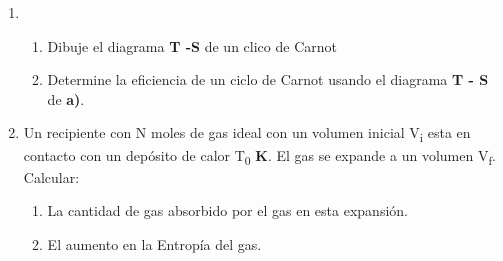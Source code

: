 \documentclass[a4paper,11pt]{extarticle} %
\newcommand{\ut}[1]{\textbf{#1}} %
\begin{document}
\begin{enumerate}[label=\textbf{\arabic*}), leftmargin=*]

    \item{
                \begin{enumerate}[label=\textbf{\alph* )}]
                    \item Dibuje el diagrama \ut{T -S } de un clico de Carnot
                    \item {Determine la eficiencia de un ciclo de Carnot usando el diagrama
                          \ut{T - S} de \ut{a)}}.
                \end{enumerate}
          }

    \vspace{\baselineskip}

    

    \vspace{\baselineskip}

    \item{Un recipiente con N moles de gas ideal con un volumen inicial V\textsubscript{i} esta en contacto con un
          depósito de calor T\textsubscript{0} \ut{K}. El gas se expande a un volumen V\textsubscript{f}. Calcular:

                \begin{enumerate}[label=\textbf{\alph* )}]
                    \item La cantidad de gas absorbido por el gas en esta expansión.
                    \item El aumento en la Entropía del gas.
                \end{enumerate}
          }

    \vspace{\baselineskip}

    

    \vspace{\baselineskip}

\end{enumerate}

\end{document}
